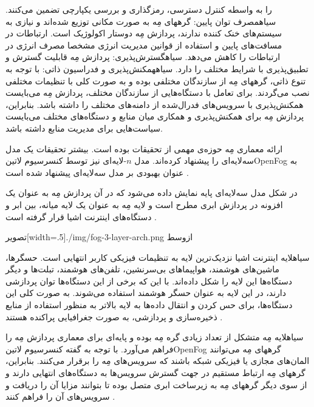 را به واسطه کنترل دسترسی، رمزگذاری و بررسی یکپارچی تضمین می‌کنند.
 ‌سیاه{مصرف توان پایین}: گرههای مِه به صورت مکانی توزیع شده‌اند و نیازی به سیستم‌های خنک کننده ندارند، پردازش مِه دوستار اکولوژیک است.
ارتباطات در مسافت‌های پایین و استفاده از قوانین مدیریت انرژی مشخصا مصرف انرژی در ارتباطات را کاهش می‌دهد.
 ‌سیاه{گسترش‌پذیری}: پردازش مِه قابلیت گسترش و تطبیق‌پذیری با شرایط مختلف را دارد.
 ‌سیاه{همکنش‌پذیری و فدراسیون ذاتی}: با توجه به تنوع ذاتی، گرههای مِه از سازندگان مختلفی بوده و به صورت کلی با تنظیمات مختلفی نصب می‌گردند.
برای تعامل با دستگاه‌هایی از سازندگان مختلف، پردازش مِه می‌بایست همکنش‌پذیری با سرویس‌های فدرال‌شده از دامنه‌های مختلف را داشته باشد.
بنابراین، پردازش مِه برای همکنش‌پذیری و همکاری میان منابع و دستگاه‌های مختلف می‌بایست سیاست‌هایی برای مدیریت منابع داشته باشد.


ارائه معماری مِه حوزه‌ی مهمی از تحقیقات بوده است. بیشتر تحقیقات یک مدل سه‌لایه‌ای را پیشنهاد کرده‌اند.
مدل $n$-لایه‌ای نیز توسط کنسرسیوم ‌لاتین{OpenFog} به عنوان بهبودی بر مدل سه‌لایه‌ای پیشنهاد شده است
.

در شکل  مدل سه‌لایه‌ای پایه نمایش داده می‌شود که در آن پردازش مِه به عنوان
یک افزونه در پردازش ابری مطرح است و لایه مِه به عنوان یک لایه میانه، بین ابر و دستگاه‌های اینترنت اشیا قرار گرفته است
.

‌تصویر[width=.5\textwidth]{./img/fog-3-layer-arch.png}
‌ازوسط

‌سیاه{لایه اینترنت اشیا} نزدیک‌ترین لایه به تنظیمات فیزیکی کاربر انتهایی است. حسگرها، ماشین‌های هوشمند، هواپیماهای بی‌سرنشین،
تلفن‌های هوشمند، تبلت‌ها و دیگر دستگاه‌ها این لایه را شکل داده‌اند. با این که برخی از این دستگاه‌ها توان پردازشی دارند، در این لایه
به عنوان حسگر هوشمند استفاده می‌شوند. به صورت کلی این دستگاه‌ها، برای حس کردن و انتقال داده‌ها
به لایه بالاتر به منظور استفاده از منابع ذخیره‌سازی و پردازشی، به صورت جغرافیایی پراکنده هستند
.

‌سیاه{لایه مِه} متشکل از تعداد زیادی گره مِه بوده و پایه‌ای برای معماری پردازش مِه را فراهم می‌آورد.
با توجه به گفته کنسرسیوم ‌لاتین{OpenFog} گرههای مِه می‌توانند المان‌های مجازی یا فیزیکی شبکه باشند که سرویس‌های مِه را برقرار می‌کنند.
بنابراین، گرههای مِه ارتباط مستقیم در جهت گسترش سرویس‌ها به دستگاه‌های انتهایی دارند و از سوی دیگر گرههای مِه به زیرساخت ابری متصل بوده تا بتوانند
مزایا آن را دریافت و سرویس‌های آن را فراهم کنند
.

